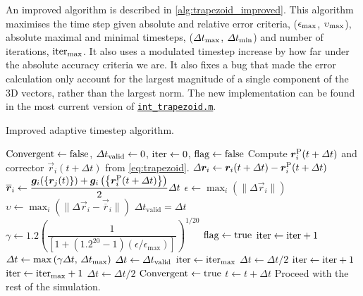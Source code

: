 An improved algorithm is described in \cref{alg:trapezoid_improved}. This algorithm maximises the time step given absolute and relative error criteria, ($\epsilon_{\textrm{max}}$, $\upsilon_{\textrm{max}}$), absolute maximal and minimal timesteps, ($\Delta t_{\textrm{max}}$, $\Delta t_{\textrm{min}}$) and number of iterations, $\textrm{iter}_{\textrm{max}}$. It also uses a modulated timestep increase by how far under the absolute accuracy criteria we are. It also fixes a bug that made the error calculation only account for the largest magnitude of a single component of the 3D vectors, rather than the largest norm. The new implementation can be found in the most current version of \href{https://github.com/TarletonGroup/EasyDD/blob/master/src/int_trapezoid.m}{\texttt{int\_trapezoid.m}}.
\begin{algorithm}
    \caption{Improved adaptive timestep algorithm.}
    \label{alg:trapezoid_improved}
    \begin{algorithmic}
        \State $\textrm{Convergent} \gets \textrm{false}$, $\Delta t_{\textrm{valid}} \gets 0$, $\textrm{iter} \gets 0$, $\textrm{flag} \gets \textrm{false}$
        \State Compute $\vec{r}_i^{\rvar{P}}(t + \Delta t)$ and corrector $\vec{r}_i(t + \Delta t)$ from \cref{eq:trapezoid}.
        \State $\Delta \vec{r}_i \gets \vec{r}_i(t + \Delta t) - \vec{r}_i^{\rvar{P}}(t + \Delta t)$
        \State $\vec{\overline{r}}_i \gets \dfrac{\vec{g}_i(\left\{\vec{r}_j(t)\right\}) + \vec{g}_i\left(\left\{\vec{r}_i^{\rvar{P}}(t + \Delta t)\right\}\right)}{2}\Delta t$
        \State $\epsilon \gets \max_i\left(\lVert \Delta \vec{r}_i \rVert \right)$
        \State $\upsilon \gets \max_i\left(\lVert \Delta \vec{r}_i - \vec{\overline{r}}_i \rVert\right)$
        \State $\Delta t_{\textrm{valid}} = \Delta t$
        \State $\gamma \gets 1.2\left(\dfrac{1}{\left[1 + (1.2^{20} - 1) (\epsilon / \epsilon_{\textrm{max}})\right]}\right)^{1/20}$
        \State $\textrm{flag} \gets \textrm{true}$
        \State $\textrm{iter} \gets \textrm{iter} + 1$
        \State $\Delta t \gets \max\left(\gamma \Delta t,\, \Delta t_{\textrm{max}}\right)$
        \State $\Delta t \gets \Delta t_{\textrm{valid}}$
        \State $\textrm{iter} \gets \textrm{iter}_{\textrm{max}}$
        \State $\Delta t \gets \Delta t / 2$
        \State $\textrm{iter} \gets \textrm{iter} + 1$
        \State $\textrm{iter} \gets \textrm{iter}_{\textrm{max}} + 1$
        \Else
        \State $\Delta t \gets \Delta t / 2$
        \EndIf
        \State $\textrm{Convergent} \gets \textrm{true}$
        \EndIf
        \EndWhile
        \State $t \gets t + \Delta t$
        \State Proceed with the rest of the simulation.
    \end{algorithmic}
\end{algorithm}


